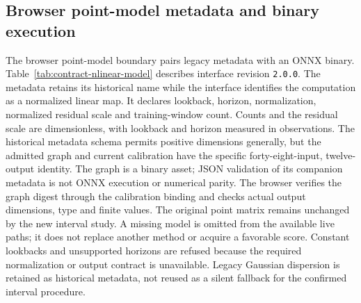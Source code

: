 \subsection{Browser point-model metadata and binary execution}
\label{sec:contract-nlinear-model}
The browser point-model boundary pairs legacy metadata with an ONNX binary. Table~\ref{tab:contract-nlinear-model} describes interface revision \texttt{2.0.0}. The metadata retains its historical name while the interface identifies the computation as a normalized linear map. It declares lookback, horizon, normalization, normalized residual scale and training-window count. Counts and the residual scale are dimensionless, with lookback and horizon measured in observations. The historical metadata schema permits positive dimensions generally, but the admitted graph and current calibration have the specific forty-eight-input, twelve-output identity. The graph is a binary asset; JSON validation of its companion metadata is not ONNX execution or numerical parity. The browser verifies the graph digest through the calibration binding and checks actual output dimensions, type and finite values. The original point matrix remains unchanged by the new interval study. A missing model is omitted from the available live paths; it does not replace another method or acquire a favorable score. Constant lookbacks and unsupported horizons are refused because the required normalization or output contract is unavailable. Legacy Gaussian dispersion is retained as historical metadata, not reused as a silent fallback for the confirmed interval procedure.


